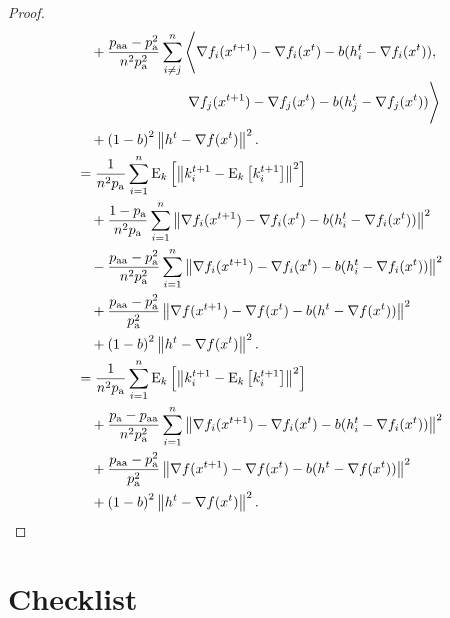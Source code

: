 \documentclass{article}
\newcommand*{\probavailable}{\ensuremath{p_{\textnormal{a}}}}
\newcommand*{\probpairaa}{\ensuremath{p_{\textnormal{aa}}}}
\begin{document}
\begin{proof}
\begin{align*}
    &\quad +\frac{\probpairaa - \probavailable^2}{n^2 \probavailable^2}\sum_{i \neq j}^n\Bigg\langle \nabla f_i(x^{t+1}) - \nabla f_i(x^{t}) - b(h^t_i - \nabla f_i(x^{t})), \\
    &\qquad\qquad\qquad\qquad \nabla f_j(x^{t+1}) - \nabla f_j(x^{t}) - b(h^t_j - \nabla f_j(x^{t}))\Bigg\rangle \\
    &\quad + \left(1 - b\right)^2 \norm{h^{t} - \nabla f(x^{t})}^2. \\
    &=\frac{1}{n^2 \probavailable}\sum_{i=1}^n \ExpSub{k}{\norm{k^{t+1}_i - \ExpSub{k}{k^{t+1}_i}}^2} \\
    &\quad + \frac{1 - \probavailable}{n^2 \probavailable}\sum_{i=1}^n \norm{\nabla f_i(x^{t+1}) - \nabla f_i(x^{t}) - b(h^t_i - \nabla f_i(x^{t}))}^2 \\
    &\quad - \frac{\probpairaa - \probavailable^2}{n^2 \probavailable^2} \sum_{i=1}^n \norm{\nabla f_i(x^{t+1}) - \nabla f_i(x^{t}) - b(h^t_i - \nabla f_i(x^{t}))}^2 \\
    &\quad + \frac{\probpairaa - \probavailable^2}{\probavailable^2} \norm{\nabla f(x^{t+1}) - \nabla f(x^{t}) - b(h^t - \nabla f(x^{t}))}^2 \\
    &\quad + \left(1 - b\right)^2 \norm{h^{t} - \nabla f(x^{t})}^2. \\
    &=\frac{1}{n^2 \probavailable}\sum_{i=1}^n \ExpSub{k}{\norm{k^{t+1}_i - \ExpSub{k}{k^{t+1}_i}}^2} \\
    &\quad + \frac{\probavailable - \probpairaa}{n^2 \probavailable^2} \sum_{i=1}^n \norm{\nabla f_i(x^{t+1}) - \nabla f_i(x^{t}) - b(h^t_i - \nabla f_i(x^{t}))}^2 \\
    &\quad + \frac{\probpairaa - \probavailable^2}{\probavailable^2} \norm{\nabla f(x^{t+1}) - \nabla f(x^{t}) - b(h^t - \nabla f(x^{t}))}^2 \\
    &\quad + \left(1 - b\right)^2 \norm{h^{t} - \nabla f(x^{t})}^2. \\
  \end{align*}
\end{proof}

\newpage
\section*{Checklist}
\end{document}
